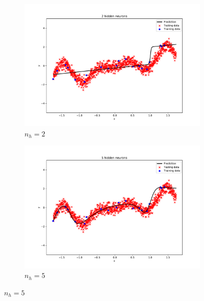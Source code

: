 \documentclass{article}
\begin{document}
\begin{figure}[!ht]
\vspace*{-80pt}
\centering
\begin{subfigure}{0.78\textwidth}
\includegraphics[width=\textwidth]{./Figures/1_1_a_nh_2.pdf}
\caption{$n_h=2$}
\end{subfigure}

\begin{subfigure}{0.78\textwidth}
\includegraphics[width=\textwidth]{./Figures/1_1_a_nh_5.pdf}
\caption{$n_h=5$}
\end{subfigure}


\end{figure}
\end{document}
